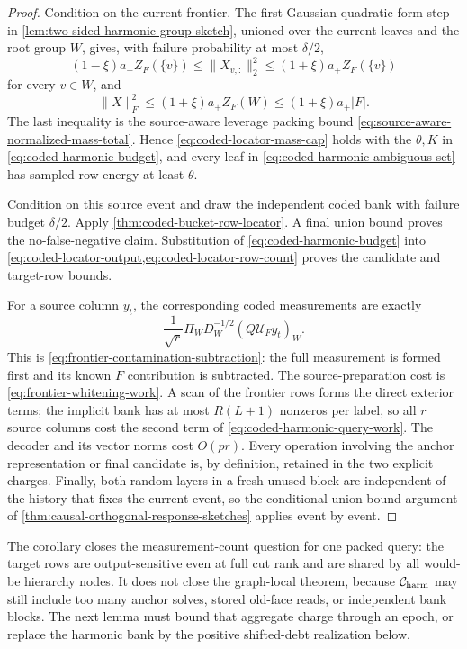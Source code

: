 \begin{proof}
Condition on the current frontier.  The first Gaussian quadratic-form step in
\cref{lem:two-sided-harmonic-group-sketch}, unioned over the current leaves
and the root group $W$, gives, with failure probability at most $\delta/2$,
\begin{equation*}
 (1-\xi)a_-Z_F(\{v\})
 \leq\|X_{v,:}\|_2^2
 \leq(1+\xi)a_+Z_F(\{v\})
\end{equation*}
for every $v\in W$, and
\begin{equation*}
 \|X\|_F^2
 \leq(1+\xi)a_+Z_F(W)
 \leq(1+\xi)a_+|F|.
\end{equation*}
The last inequality is the source-aware leverage packing bound
\cref{eq:source-aware-normalized-mass-total}.  Hence
\cref{eq:coded-locator-mass-cap} holds with the $\theta,K$ in
\cref{eq:coded-harmonic-budget}, and every leaf in
\cref{eq:coded-harmonic-ambiguous-set} has sampled row energy at least
$\theta$.

Condition on this source event and draw the independent coded bank with
failure budget $\delta/2$.  Apply
\cref{thm:coded-bucket-row-locator}.  A final union bound proves the
no-false-negative claim.  Substitution of
\cref{eq:coded-harmonic-budget} into
\cref{eq:coded-locator-output,eq:coded-locator-row-count} proves the candidate
and target-row bounds.

For a source column $y_t$, the corresponding coded measurements are exactly
\begin{equation*}
 \frac1{\sqrt r}\Pi_WD_W^{-1/2}
      (Q\mathcal U_Fy_t)_W.
\end{equation*}
This is \cref{eq:frontier-contamination-subtraction}: the full measurement is
formed first and its known $F$ contribution is subtracted.  The
source-preparation cost is
\cref{eq:frontier-whitening-work}.  A scan of the frontier rows forms the
direct exterior terms; the implicit bank has at most $R(L+1)$ nonzeros per
label, so all $r$ source columns cost the second term of
\cref{eq:coded-harmonic-query-work}.  The decoder and its vector norms cost
$O(pr)$.  Every operation involving the anchor representation or final
candidate is, by definition, retained in the two explicit charges.  Finally,
  both random layers in a fresh unused block are independent of the history
  that fixes the current event, so the conditional union-bound argument of
\cref{thm:causal-orthogonal-response-sketches} applies event by event.
\end{proof}

The corollary closes the measurement-count question for one packed query:
the target rows are output-sensitive even at full cut rank and are shared by
all would-be hierarchy nodes.  It does not close the graph-local theorem,
because $\mathcal C_{\rm harm}$ may still include too many anchor solves,
stored old-face reads, or independent bank blocks.  The next lemma must bound
that aggregate charge through an epoch, or replace the harmonic bank by the
positive shifted-debt realization below.

